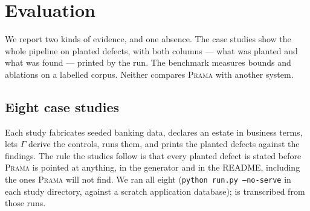 \documentclass[11pt,a4paper]{article}
\renewcommand{\_}{\oldunderscore\allowbreak}
\theoremstyle{plain}
\theoremstyle{definition}
\theoremstyle{remark}
\newcommand{\Gam}{\Gamma}
\begin{document}
\section{Evaluation}\label{sec:eval}

We report two kinds of evidence, and one absence. The case studies show the whole pipeline on planted
defects, with both columns --- what was planted and what was found --- printed by the run. The benchmark
measures bounds and ablations on a labelled corpus. Neither compares \textsc{Prama} with another system.

\subsection{Eight case studies}

Each study fabricates seeded banking data, declares an estate in business terms, lets $\Gam$ derive the
controls, runs them, and prints the planted defects against the findings. The rule the studies follow is
that every planted defect is stated before \textsc{Prama} is pointed at anything, in the generator and in the
README, including the ones \textsc{Prama} will not find. We ran all eight
(\texttt{python run.py --no-serve} in each study directory, against a scratch application database);
 is transcribed from those runs.
\end{document}

